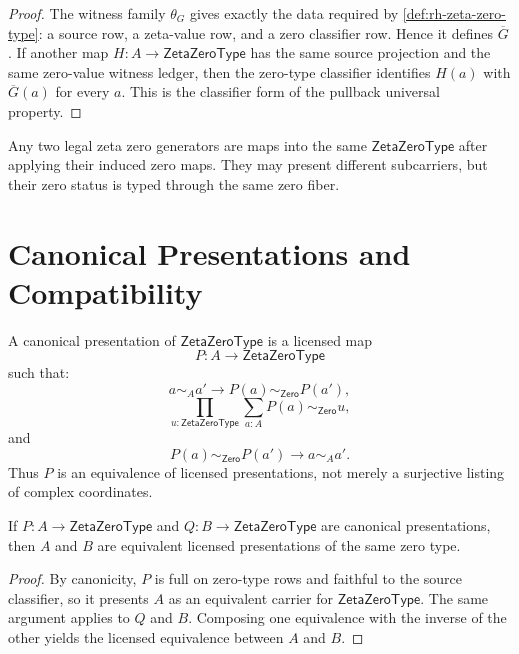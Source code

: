 \begin{proof}
The witness family $\theta_G$ gives exactly the data required by
\autoref{def:rh-zeta-zero-type}: a source row, a zeta-value row, and a
zero classifier row. Hence it defines $\overline G$. If another map
$H:A\to\mathsf{ZetaZeroType}$ has the same source projection and the same
zero-value witness ledger, then the zero-type classifier identifies
$H(a)$ with $\overline G(a)$ for every $a$. This is the classifier form of
the pullback universal property.
\end{proof}

\begin{corollary}
\label{cor:rh-zeta-zero-generators-share-zero-fiber}
Any two legal zeta zero generators are maps into the same
$\mathsf{ZetaZeroType}$ after applying their induced zero maps. They may
present different subcarriers, but their zero status is typed through the
same zero fiber.
\end{corollary}

\section{Canonical Presentations and Compatibility}
\label{sec:rh-zeta-zero-type-canonical-presentations}

\begin{definition}
\label{def:rh-zeta-zero-canonical-presentation}
A canonical presentation of $\mathsf{ZetaZeroType}$ is a licensed map
$$
P:A\to\mathsf{ZetaZeroType}
$$
such that:
$$
a\sim_A a'
\to
P(a)\sim_{\mathsf{Zero}}P(a'),
$$
$$
\prod_{u:\mathsf{ZetaZeroType}}
\sum_{a:A}P(a)\sim_{\mathsf{Zero}}u,
$$
and
$$
P(a)\sim_{\mathsf{Zero}}P(a')
\to
a\sim_A a'.
$$
Thus $P$ is an equivalence of licensed presentations, not merely a
surjective listing of complex coordinates.
\end{definition}

\begin{theorem}
\label{thm:rh-zeta-zero-canonical-presentations-equivalent}
If $P:A\to\mathsf{ZetaZeroType}$ and
$Q:B\to\mathsf{ZetaZeroType}$ are canonical presentations, then $A$ and
$B$ are equivalent licensed presentations of the same zero type.
\end{theorem}

\begin{proof}
By canonicity, $P$ is full on zero-type rows and faithful to the source
classifier, so it presents $A$ as an equivalent carrier for
$\mathsf{ZetaZeroType}$. The same argument applies to $Q$ and $B$.
Composing one equivalence with the inverse of the other yields the
licensed equivalence between $A$ and $B$.
\end{proof}

